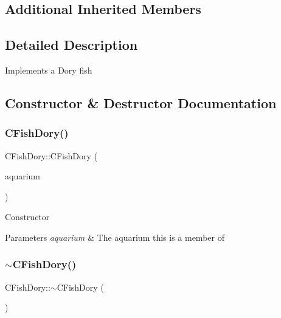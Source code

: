 \subsection*{Additional Inherited Members}


\subsection{Detailed Description}
Implements a Dory fish 

\subsection{Constructor \& Destructor Documentation}
\mbox{\label{class_c_fish_dory_a7ed7364e99765e9424fc30e8de6124d9}} 
\subsubsection{\texorpdfstring{C\+Fish\+Dory()}{CFishDory()}}
{\footnotesize\ttfamily C\+Fish\+Dory\+::\+C\+Fish\+Dory (\begin{DoxyParamCaption}\item[{\mbox{\hyperlink{class_c_aquarium}{C\+Aquarium}} $\ast$}]{aquarium }\end{DoxyParamCaption})}

Constructor 
\begin{DoxyParams}{Parameters}
{\em aquarium} & The aquarium this is a member of \\
\hline
\end{DoxyParams}
\mbox{\label{class_c_fish_dory_abe5cd45721286d8a67aacbe5e3cdc580}} 
\subsubsection{\texorpdfstring{$\sim$\+C\+Fish\+Dory()}{~CFishDory()}}
{\footnotesize\ttfamily C\+Fish\+Dory\+::$\sim$\+C\+Fish\+Dory (\begin{DoxyParamCaption}{ }\end{DoxyParamCaption})\hspace{0.3cm}{\ttfamily [virtual]}}

